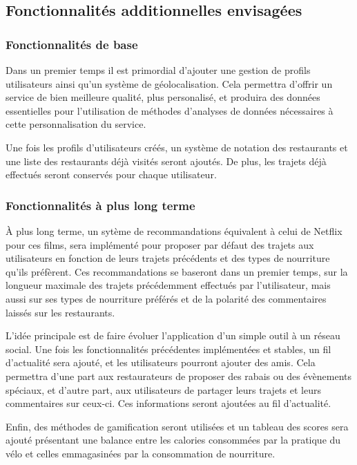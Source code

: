 \documentclass[12pt]{article}
\begin{document}
\subsection{Fonctionnalités additionnelles envisagées}

    \subsubsection{Fonctionnalités de base}

        Dans un premier temps il est primordial d'ajouter une gestion de profils utilisateurs ainsi qu'un système de géolocalisation. Cela permettra d'offrir un service de bien meilleure qualité, plus personalisé, et produira des données essentielles pour l'utilisation de méthodes d'analyses de données nécessaires à cette personnalisation du service.

        Une fois les profils d'utilisateurs créés, un système de notation des restaurants et une liste des restaurants déjà visités seront ajoutés. De plus, les trajets déjà effectués seront conservés pour chaque utilisateur.

    \subsubsection{Fonctionnalités à plus long terme}

        À plus long terme, un sytème de recommandations équivalent à celui de Netflix pour ces films, sera implémenté pour proposer par défaut des trajets aux utilisateurs en fonction de leurs trajets précédents et des types de nourriture qu'ils préfèrent. Ces recommandations se baseront dans un premier temps, sur la longueur maximale des trajets précédemment effectués par l'utilisateur, mais aussi sur ses types de nourriture préférés et de la polarité des commentaires laissés sur les restaurants. 

        L'idée principale est de faire évoluer l'application d'un simple outil à un réseau social. Une fois les fonctionnalités précédentes implémentées et stables, un fil d'actualité sera ajouté, et les utilisateurs pourront ajouter des amis. Cela permettra d'une part aux restaurateurs de proposer des rabais ou des évènements spéciaux, et d'autre part, aux utilisateurs de partager leurs trajets et leurs commentaires sur ceux-ci. Ces informations seront ajoutées au fil d'actualité.

        Enfin, des méthodes de gamification seront utilisées et un tableau des scores sera ajouté présentant une balance entre les calories consommées par la pratique du vélo et celles emmagasinées par la consommation de nourriture.
\end{document}
